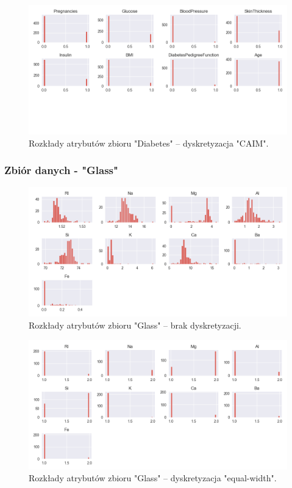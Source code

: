     \begin{figure}[H]
        \includegraphics[width=\textwidth]{img/discretization/caim_diabetes.png}
        \caption{Rozkłady atrybutów zbioru "Diabetes" -- dyskretyzacja "CAIM".}
    \end{figure}

\subsubsection{Zbiór danych - "Glass"}
    \begin{figure}[H]
        \includegraphics[width=\textwidth]{img/discretization/non_discretized_glass.png}
        \caption{Rozkłady atrybutów zbioru "Glass" -- brak dyskretyzacji.}
    \end{figure}

    \begin{figure}[H]
        \includegraphics[width=\textwidth]{img/discretization/ew_glass.png}
        \caption{Rozkłady atrybutów zbioru "Glass" -- dyskretyzacja "equal-width".}
    \end{figure}

